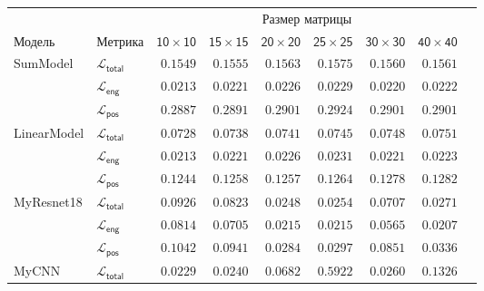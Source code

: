 \documentclass[a4paper,12pt]{extarticle}
\begin{document}
\begin{table}[ht]
	\footnotesize
	\centering
	\begin{tabular}{llrrrrrrr}
		\toprule
		{} & {} & \multicolumn{6}{c}{\textsf{Размер матрицы}} \\
		\cmidrule(lr){3-8}
		\textsf{Модель} & \textsf{Метрика} & $\mathsf{10 \times 10}$ &  $\mathsf{15 \times 15}$ &  $\mathsf{20 \times 20}$ &  $\mathsf{25 \times 25}$ &  $\mathsf{30 \times 30}$ &  $\mathsf{40 \times 40}$ \\
		\midrule
        \textsf{SumModel} & $\mathcal{L}_{\mathsf{total}}$ & $\mathsf{0.1549}$ & $\mathsf{0.1555}$ & $\mathsf{0.1563}$ & $\mathsf{0.1575}$ & $\mathsf{0.1560}$ & $\mathsf{0.1561}$ \\
        {} & $\mathcal{L}_{\mathsf{eng}}$ & $\mathsf{0.0213}$ & $\mathsf{0.0221}$ & $\mathsf{0.0226}$ & $\mathsf{0.0229}$ & $\mathsf{0.0220}$ & $\mathsf{0.0222}$ \\
        {} & $\mathcal{L}_{\mathsf{pos}}$ & $\mathsf{0.2887}$ & $\mathsf{0.2891}$ & $\mathsf{0.2901}$ & $\mathsf{0.2924}$ & $\mathsf{0.2901}$ & $\mathsf{0.2901}$ \\
        \midrule
        \textsf{LinearModel} & $\mathcal{L}_{\mathsf{total}}$ & $\mathsf{0.0728}$ & $\mathsf{0.0738}$ & $\mathsf{0.0741}$ & $\mathsf{0.0745}$ & $\mathsf{0.0748}$ & $\mathsf{0.0751}$ \\
        {} & $\mathcal{L}_{\mathsf{eng}}$ & $\mathsf{0.0213}$ & $\mathsf{0.0221}$ & $\mathsf{0.0226}$ & $\mathsf{0.0231}$ & $\mathsf{0.0221}$ & $\mathsf{0.0223}$ \\
        {} & $\mathcal{L}_{\mathsf{pos}}$ & $\mathsf{0.1244}$ & $\mathsf{0.1258}$ & $\mathsf{0.1257}$ & $\mathsf{0.1264}$ & $\mathsf{0.1278}$ & $\mathsf{0.1282}$ \\
        \midrule
        \textsf{MyResnet18} & $\mathcal{L}_{\mathsf{total}}$ & $\mathsf{0.0926}$ & $\mathsf{0.0823}$ & $\mathsf{0.0248}$ & $\mathsf{0.0254}$ & $\mathsf{0.0707}$ & $\mathsf{0.0271}$ \\
        {} & $\mathcal{L}_{\mathsf{eng}}$ & $\mathsf{0.0814}$ & $\mathsf{0.0705}$ & $\mathsf{0.0215}$ & $\mathsf{0.0215}$ & $\mathsf{0.0565}$ & $\mathsf{0.0207}$ \\
        {} & $\mathcal{L}_{\mathsf{pos}}$ & $\mathsf{0.1042}$ & $\mathsf{0.0941}$ & $\mathsf{0.0284}$ & $\mathsf{0.0297}$ & $\mathsf{0.0851}$ & $\mathsf{0.0336}$ \\
        \midrule
        \textsf{MyCNN} & $\mathcal{L}_{\mathsf{total}}$ & $\mathsf{0.0229}$ & $\mathsf{0.0240}$ & $\mathsf{0.0682}$ & $\mathsf{0.5922}$ & $\mathsf{0.0260}$ & $\mathsf{0.1326}$ \\

\end{tabular}
\end{table}
\end{document}
